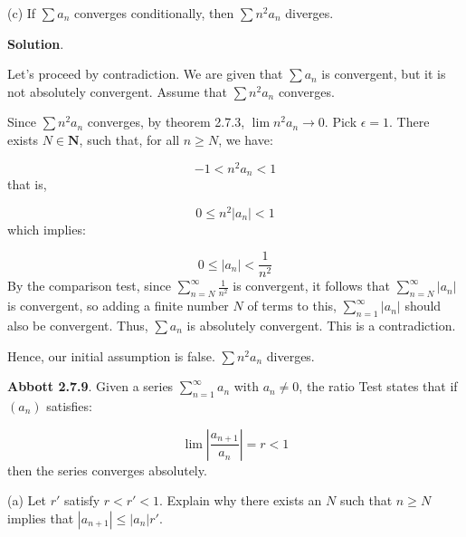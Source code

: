 \documentclass[10pt]{article}
\begin{document}
(c) If $\displaystyle \sum a_{n}$ converges conditionally, then $\displaystyle \sum n^{2} a_{n}$ diverges.



\textbf{Solution}.



Let's proceed by contradiction. We are given that $\displaystyle \sum a_{n}$ is convergent, but it is not absolutely convergent. Assume that $\displaystyle \sum n^{2} a_{n}$ converges.



Since $\displaystyle \sum n^{2} a_{n}$ converges, by theorem 2.7.3, $\displaystyle \lim n^{2} a_{n}\rightarrow 0$. Pick $\displaystyle \epsilon =1$. There exists $\displaystyle N\in \mathbf{N}$, such that, for all $\displaystyle n\geq N$, we have:


\begin{equation*}
-1< n^{2} a_{n} < 1
\end{equation*}
that is,


\begin{equation*}
0\leq n^{2} |a_{n} |< 1
\end{equation*}
which implies:


\begin{equation*}
0\leq |a_{n} |< \frac{1}{n^{2}}
\end{equation*}
By the comparison test, since $\displaystyle \sum _{n=N}^{\infty }\frac{1}{n^{2}}$ is convergent, it follows that $\displaystyle \sum _{n=N}^{\infty } |a_{n} |$ is convergent, so adding a finite number $\displaystyle N$ of terms to this, $\displaystyle \sum _{n=1}^{\infty } |a_{n} |$ should also be convergent. Thus, $\displaystyle \sum a_{n}$ is absolutely convergent. This is a contradiction.



Hence, our initial assumption is false. $\displaystyle \sum n^{2} a_{n}$ diverges.



\textbf{Abbott 2.7.9}. Given a series $\displaystyle \sum _{n=1}^{\infty } a_{n}$ with $\displaystyle a_{n} \neq 0$, the ratio Test states that if $\displaystyle ( a_{n})$ satisfies:


\begin{equation*}
\lim \left| \frac{a_{n+1}}{a_{n}}\right| =r< 1
\end{equation*}
then the series converges absolutely.



(a) Let $\displaystyle r'$ satisfy $\displaystyle r< r'< 1$. Explain why there exists an $\displaystyle N$ such that $\displaystyle n\geq N$ implies that $\displaystyle |a_{n+1} |\leq |a_{n} |r'$.
\end{document}
